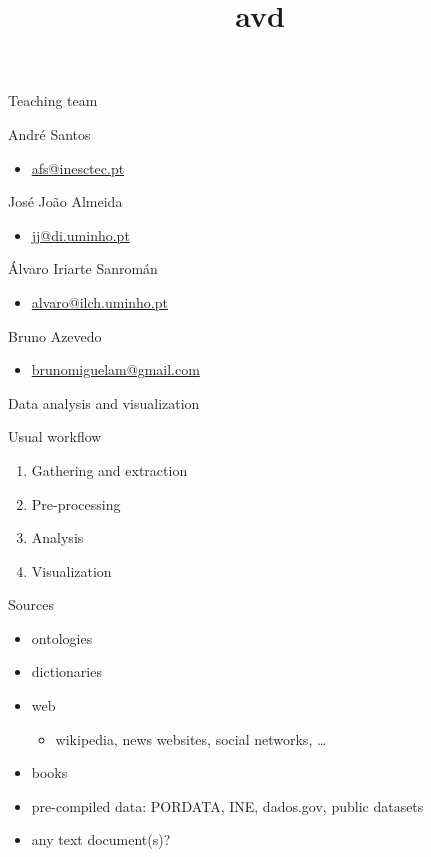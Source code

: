 \documentclass[serif,14pt,color=usenames,dvipsnames]{beamer}
\title{\Huge avd}
\begin{document}
\begin{frame}
\maketitle
\end{frame}

\begin{frame}{Teaching team}
  \begin{block}{André Santos}
    \begin{itemize}
      \item \url{afs@inesctec.pt}
    \end{itemize}
  \end{block}
  \begin{block}{José João Almeida}
    \begin{itemize}
      \item \url{jj@di.uminho.pt}
    \end{itemize}
  \end{block}
  \begin{block}{Álvaro Iriarte Sanromán}
    \begin{itemize}
      \item \url{alvaro@ilch.uminho.pt}
    \end{itemize}
  \end{block}
  \begin{block}{Bruno Azevedo}
    \begin{itemize}
      \item \url{brunomiguelam@gmail.com}
    \end{itemize}
  \end{block}
\end{frame}

\begin{frame}{Data analysis and visualization}
  \begin{block}{Usual workflow}
    \begin{enumerate}
      \item Gathering and extraction
      \item Pre-processing
      \item Analysis
      \item Visualization
    \end{enumerate}
  \end{block}
\end{frame}

\begin{frame}{Sources}
  \begin{itemize}
    \item ontologies
    \item dictionaries
    \item web
    \begin{itemize}
      \item wikipedia, news websites, social networks, \dots
    \end{itemize}
    \item books
    \item pre-compiled data: PORDATA, INE, dados.gov, public datasets
    \item any text document(s)?
  \end{itemize}
\end{frame}
\end{document}
